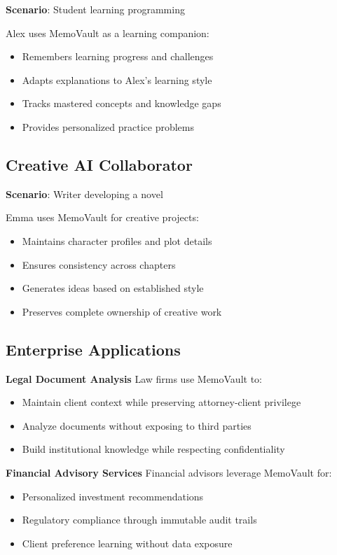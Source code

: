 \documentclass[12pt, a4paper]{article}
\begin{document}
\textbf{Scenario}: Student learning programming

Alex uses MemoVault as a learning companion:
\begin{itemize}
    \item Remembers learning progress and challenges
    \item Adapts explanations to Alex's learning style
    \item Tracks mastered concepts and knowledge gaps
    \item Provides personalized practice problems
\end{itemize}

\subsection{Creative AI Collaborator}

\textbf{Scenario}: Writer developing a novel

Emma uses MemoVault for creative projects:
\begin{itemize}
    \item Maintains character profiles and plot details
    \item Ensures consistency across chapters
    \item Generates ideas based on established style
    \item Preserves complete ownership of creative work
\end{itemize}

\subsection{Enterprise Applications}

\textbf{Legal Document Analysis}
Law firms use MemoVault to:
\begin{itemize}
    \item Maintain client context while preserving attorney-client privilege
    \item Analyze documents without exposing to third parties
    \item Build institutional knowledge while respecting confidentiality
\end{itemize}

\textbf{Financial Advisory Services}
Financial advisors leverage MemoVault for:
\begin{itemize}
    \item Personalized investment recommendations
    \item Regulatory compliance through immutable audit trails
    \item Client preference learning without data exposure
\end{itemize}
\end{document}
